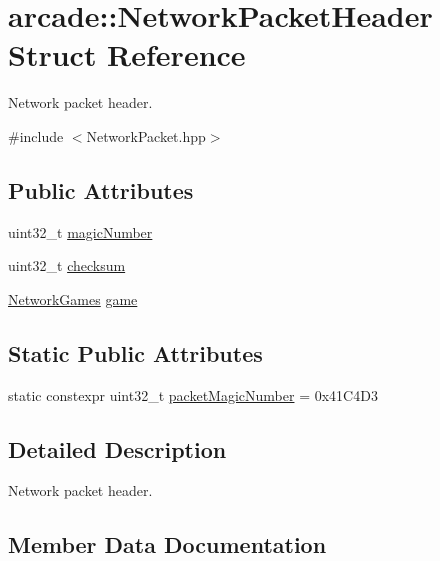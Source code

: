 \hypertarget{structarcade_1_1_network_packet_header}{}\section{arcade\+:\+:Network\+Packet\+Header Struct Reference}
\label{structarcade_1_1_network_packet_header}


Network packet header.  




{\ttfamily \#include $<$Network\+Packet.\+hpp$>$}

\subsection*{Public Attributes}
\begin{DoxyCompactItemize}
\item 
uint32\+\_\+t \hyperlink{structarcade_1_1_network_packet_header_a4d6f47edd6e4596028680131f8575cae}{magic\+Number}
\item 
uint32\+\_\+t \hyperlink{structarcade_1_1_network_packet_header_a9ccebe960cf3f7461c2228c48ebe97a2}{checksum}
\item 
\hyperlink{namespacearcade_ac69775ea7f779dc95b0e7769f61ea6aa}{Network\+Games} \hyperlink{structarcade_1_1_network_packet_header_a640a3e1b6eb8c3580f535c593d852241}{game}
\end{DoxyCompactItemize}
\subsection*{Static Public Attributes}
\begin{DoxyCompactItemize}
\item 
static constexpr uint32\+\_\+t \hyperlink{structarcade_1_1_network_packet_header_a5abaf4eae1f868651c04f94c54b7338f}{packet\+Magic\+Number} = 0x41\+C4\+D3
\end{DoxyCompactItemize}


\subsection{Detailed Description}
Network packet header. 

\subsection{Member Data Documentation}
\mbox{\label{structarcade_1_1_network_packet_header_a9ccebe960cf3f7461c2228c48ebe97a2}} 
